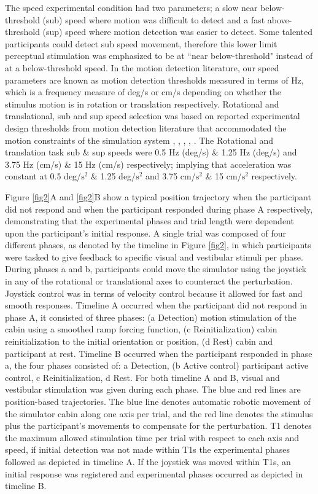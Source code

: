\noindent The speed experimental condition had two parameters; a slow near below-threshold (sub) speed where motion was difficult to detect and a fast above-threshold (sup) speed where motion detection was easier to detect. Some talented participants could detect sub speed movement, therefore this lower limit perceptual stimulation was emphasized to be at ``near below-threshold" instead of at a below-threshold speed. In the motion detection literature, our speed parameters are known as motion detection thresholds measured in terms of Hz, which is a frequency measure of deg/s or cm/s depending on whether the stimulus motion is in rotation or translation respectively. Rotational and translational, sub and sup speed selection was based on reported experimental design thresholds from motion detection literature that accommodated the motion constraints of the simulation system \cite{Hartmann_2014_Direction}, \cite{BermudezRey_2016_Vestibular}, \cite{Karmali_2017_Multivariate}, \cite{Valko_2012_Vestibular}, \cite{Melvill_1978_Vertical}. The Rotational and translation task sub \& sup speeds were 0.5 Hz (deg/s) \& 1.25 Hz (deg/s) and 3.75 Hz (cm/s) \& 15 Hz (cm/s) respectively; implying that acceleration was constant at 0.5 deg/$\textrm{s}^{2}$ \& 1.25 deg/$\textrm{s}^{2}$ and 3.75 cm/$\textrm{s}^{2}$ \& 15 cm/$\textrm{s}^{2}$ respectively.

\indent Figure \ref{fig2}A and \ref{fig2}B show a typical position trajectory when the participant did not respond and when the participant responded during phase A respectively, demonstrating that the experimental phases and trial length were dependent upon the participant’s initial response. A single trial was composed of four different phases, as denoted by the timeline in Figure \ref{fig2}, in which participants were tasked to give feedback to specific visual and vestibular stimuli per phase. During phases a and b, participants could move the simulator using the joystick in any of the rotational or translational axes to counteract the perturbation. Joystick control was in terms of velocity control because it allowed for fast and smooth responses. Timeline A occurred when the participant did not respond in phase A, it consisted of three phases: (a Detection) motion stimulation of the cabin using a smoothed ramp forcing function, (c Reinitialization) cabin reinitialization to the initial orientation or position, (d Rest) cabin and participant at rest. Timeline B occurred when the participant responded in phase a, the four phases consisted of: a Detection, (b Active control) participant active control, c Reinitialization, d Rest. For both timeline A and B, visual and vestibular stimulation was given during each phase. The blue and red lines are position-based trajectories. The blue line denotes automatic robotic movement of the simulator cabin along one axis per trial, and the red line denotes the stimulus plus the participant’s movements to compensate for the perturbation. T1 denotes the maximum allowed stimulation time per trial with respect to each axis and speed, if initial detection was not made within T1s the experimental phases followed as depicted in timeline A. If the joystick was moved within T1s, an initial response was registered and experimental phases occurred as depicted in timeline B.

